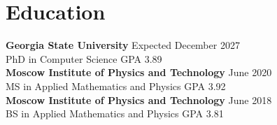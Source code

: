 \documentclass[11pt,a4paper]{article}
\begin{document}
\section*{Education}
\noindent\textbf{Georgia State University} \hfill Expected December 2027\\
PhD in Computer Science \hfill
GPA 3.89\\[0.3em]
\textbf{Moscow Institute of Physics and Technology} \hfill June 2020\\
MS in Applied Mathematics and Physics \hfill
GPA 3.92\\[0.3em]
\textbf{Moscow Institute of Physics and Technology} \hfill June 2018\\
BS in Applied Mathematics and Physics \hfill
GPA 3.81
\end{document}

